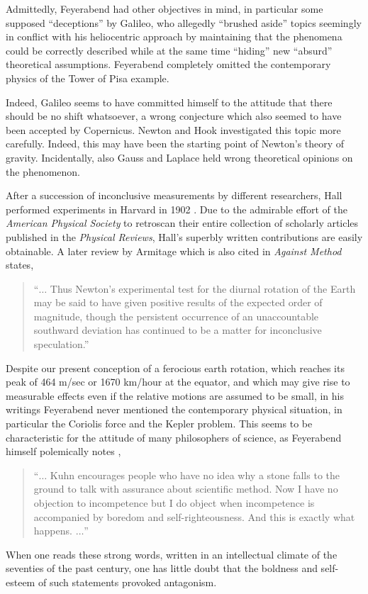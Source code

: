 \documentclass{article}
\begin{document}
Admittedly, Feyerabend had other objectives in mind,
in particular some supposed   ``deceptions'' by Galileo,
who allegedly ``brushed aside'' topics seemingly in conflict with his heliocentric approach by maintaining that the phenomena
could be correctly described while at the same time
``hiding'' new ``absurd'' theoretical assumptions.
Feyerabend completely omitted the contemporary physics of the Tower of Pisa example.

Indeed, Galileo seems to have committed himself to the attitude that
there should be no shift whatsoever,
a wrong conjecture which also seemed to have been accepted  by Copernicus.
Newton and Hook investigated this topic more carefully.
Indeed, this may have been the starting point of Newton's theory of gravity.
Incidentally, also Gauss  and  Laplace held wrong theoretical opinions on the phenomenon.

After a succession of inconclusive measurements by different researchers,
Hall performed  experiments in Harvard in 1902
 \cite{hall-1903a,hall-1903b}.
Due to the admirable effort of the {\em American Physical Society}
to retroscan their entire collection of scholarly articles published in the {\em Physical Reviews},
Hall's superbly written contributions are easily obtainable.
A later review by Armitage \cite{armitage} which is also cited in  {\em Against Method}
states,
\begin{quote}
{ ``$\ldots$ Thus Newton's experimental test for the diurnal rotation
of the Earth may be said to have given positive results of the expected
order of magnitude, though the persistent occurrence of an unaccountable southward deviation
has continued to be a matter for inconclusive speculation.''}
\end{quote}

Despite our present conception of a ferocious earth rotation,
which reaches its peak of  464 m/sec or  1670 km/hour at the equator,
and which may give rise to measurable effects even if the relative motions are assumed to be small,
in his writings Feyerabend never mentioned the contemporary physical situation,
in particular the Coriolis force  and  the Kepler problem.
This seems to be characteristic for the attitude of many philosophers of science,
as Feyerabend himself polemically notes \cite{feyerabend-defense,feyer-81},
\begin{quote}
{ ``$\ldots$ Kuhn encourages people who have no idea why a stone falls to the ground
to talk with assurance about scientific method.
Now I have no objection to incompetence but I do object when incompetence is accompanied by boredom
and self-righteousness.
And this is exactly what happens. $\ldots$''}
\end{quote}
When one reads these strong words,
written in an intellectual climate of the seventies of the past century,
one has little doubt that the boldness and self-esteem of such statements
provoked antagonism.
\end{document}
